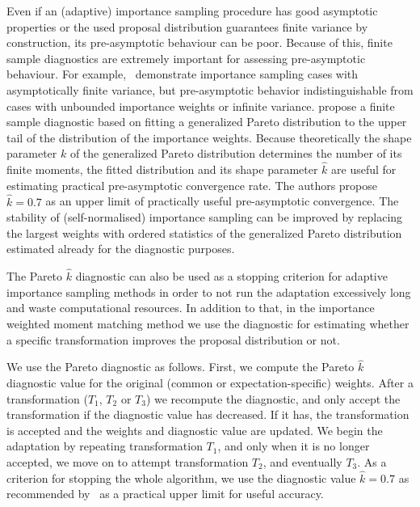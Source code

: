 \documentclass[12pt]{article}
\begin{document}
Even if an (adaptive) importance sampling procedure has good asymptotic properties
or the used proposal distribution guarantees finite variance by construction, its
pre-asymptotic behaviour can be poor. Because of this, finite
sample diagnostics are extremely important for assessing pre-asymptotic behaviour.
For example,~\citet{vehtari2015pareto} demonstrate importance sampling cases with asymptotically finite variance, but pre-asymptotic behavior indistinguishable from
cases with unbounded importance weights or infinite variance.
\citet{vehtari2015pareto} propose a finite sample diagnostic based on fitting a
generalized Pareto distribution to the upper tail of the distribution of the importance weights.
Because theoretically the shape parameter $k$ of the generalized Pareto distribution determines the number of its finite moments,
the fitted distribution and its shape parameter $\hat{k}$ are useful for estimating practical pre-asymptotic
convergence rate.
The authors propose $\hat{k} = 0.7$ as an upper limit of practically useful pre-asymptotic convergence. The stability of (self-normalised) importance sampling can be improved by replacing the largest weights with ordered statistics of the generalized Pareto distribution estimated already for the diagnostic purposes.

%
%
%
%
%
%
%


The Pareto $\hat{k}$ diagnostic can also be used as a stopping criterion for adaptive importance sampling methods
in order to not run the adaptation excessively long and waste computational resources.
In addition to that, in the
importance weighted moment matching method we use the diagnostic for
estimating whether a specific transformation
improves the proposal distribution or not.
%
%
%
%
%
%
%
%
%
%
%
%
%
%



We use the Pareto diagnostic as follows.
First, we compute the Pareto $\hat{k}$ diagnostic value
for the original (common or expectation-specific) weights. After a transformation ($T_1$, $T_2$ or $T_3$) we recompute the diagnostic, and
only accept the transformation if the diagnostic value has decreased. If it has, the transformation is accepted and
the weights and diagnostic value are updated.
We begin the adaptation by repeating transformation $T_1$, and
only when it is no longer accepted, we move on to
attempt transformation $T_2$, and eventually $T_3$.
As a criterion for stopping the whole algorithm, we use the diagnostic value $\hat{k} = 0.7$ as recommended by~\citet{vehtari2015pareto}
as a practical upper limit for useful accuracy.
\end{document}
